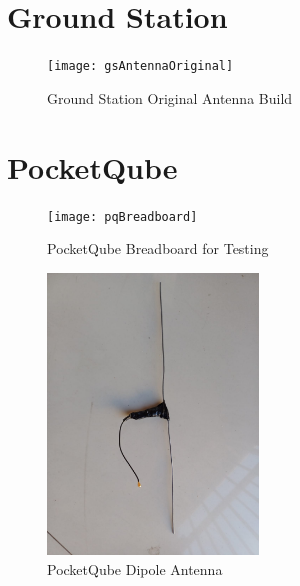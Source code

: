 \section{Ground Station}\label{sec:appendix_gs_antenna_original}
\begin{figure}[!htb]
  \centering
  \texttt{[image: gsAntennaOriginal]}
  \caption{Ground Station Original Antenna Build}
  \label{fig:gsAntennaOriginal}
\end{figure}
\newpage
\section{PocketQube}\label{sec:appendix_pq}
\begin{figure}[!htb]
    \centering
    \texttt{[image: pqBreadboard]}
    \caption{PocketQube Breadboard for Testing}
    \label{fig:pqBreadboard}
\end{figure}
\begin{figure}[!htb]
  \centering
  \includegraphics[width=0.5\textwidth]{pqAntenna}
  \caption{PocketQube Dipole Antenna}
  \label{fig:pqAntenna}
\end{figure}
\newpage
